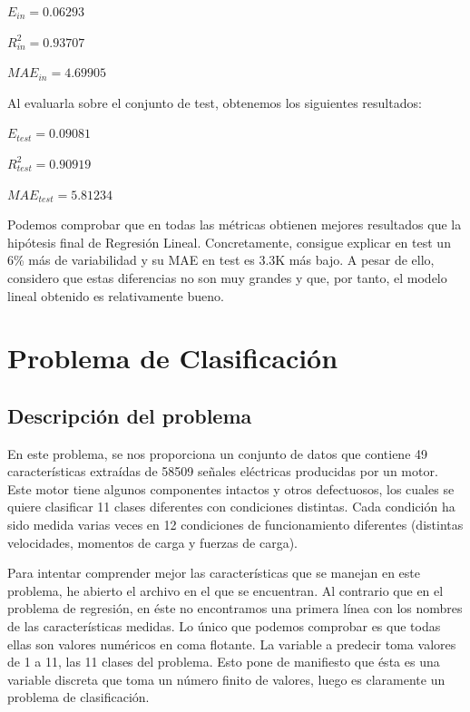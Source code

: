 \documentclass[10pt,a4paper]{article}
\begin{document}
$E_{in} = 0.06293$

$R^2_{in} = 0.93707$

$MAE_{in} = 4.69905$

Al evaluarla sobre el conjunto de test, obtenemos los siguientes resultados:

$E_{test} = 0.09081$

$R^2_{test} = 0.90919$

$MAE_{test} = 5.81234$

Podemos comprobar que en todas las métricas obtienen mejores resultados que la hipótesis final de Regresión Lineal. Concretamente, consigue explicar en test un 6\% más de variabilidad y su MAE en test es $3.3$K más bajo. A pesar de ello, considero que estas diferencias no son muy grandes y que, por tanto, el modelo lineal obtenido es relativamente bueno.

















\newpage

\section{Problema de Clasificación}

\subsection{Descripción del problema}

En este problema, se nos proporciona un conjunto de datos que contiene 49 características extraídas de 58509 señales eléctricas producidas por un motor. Este motor tiene algunos componentes intactos y otros defectuosos, los cuales se quiere clasificar 11 clases diferentes con condiciones distintas. Cada condición ha sido medida varias veces en 12 condiciones de funcionamiento diferentes (distintas velocidades, momentos de carga y fuerzas de carga). 

Para intentar comprender mejor las características que se manejan en este problema, he abierto el archivo en el que se encuentran. Al contrario que en el problema de regresión, en éste no encontramos una primera línea con los nombres de las características medidas. Lo único que podemos comprobar es que todas ellas son valores numéricos en coma flotante. La variable a predecir toma valores de 1 a 11, las 11 clases del problema. Esto pone de manifiesto que ésta es una variable discreta que toma un número finito de valores, luego es claramente un problema de clasificación.
\end{document}
